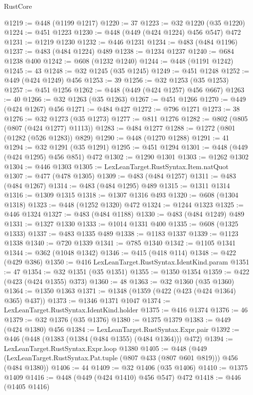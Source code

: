 \begin{lexlean}{RustCore}
\begin{coremodule}
@1219 := @448 (@1199 @1217)
@1220 := 37
@1223 := @32 @1220 (@35 @1220)
@1224 := @451 @1223
@1230 := @448 (@449 (@424 @1224) @456 @547) @472
@1231 := @1219 @1230
@1232 := @446 @1231
@1234 := @483 (@484 @1196)
@1237 := @483 (@484 @1224) @489
@1238 := @1234 @1237
@1240 := @684 @1238 @400
@1242 := @608 (@1232 @1240)
@1244 := @448 (@1191 @1242)
@1245 := 43
@1248 := @32 @1245 (@35 @1245)
@1249 := @451 @1248
@1252 := @449 (@424 @1249) @456
@1253 := 39
@1256 := @32 @1253 (@35 @1253)
@1257 := @451 @1256
@1262 := @448 (@449 (@424 @1257) @456 @667)
@1263 := 40
@1266 := @32 @1263 (@35 @1263)
@1267 := @451 @1266
@1270 := @449 (@424 @1267) @456
@1271 := @484 @427
@1272 := @796 @1271
@1273 := 38
@1276 := @32 @1273 (@35 @1273)
@1277 := @811 @1276
@1282 := @802 (@805 (@807 (@424 @1277) @1113))
@1283 := @484 @1277
@1288 := @1272 (@801 (@1282 (@526 @1283)) @829)
@1290 := @448 (@1270 @1288)
@1291 := 41
@1294 := @32 @1291 (@35 @1291)
@1295 := @451 @1294
@1301 := @448 (@449 (@424 @1295) @456 @851) @472
@1302 := @1290 @1301
@1303 := @1262 @1302
@1304 := @446 @1303
@1305 := LexLeanTarget.RustSyntax.Item.natQuot
@1307 := @477 (@478 @1305)
@1309 := @483 (@484 @1257)
@1311 := @483 (@484 @1267)
@1314 := @483 (@484 @1295) @489
@1315 := @1311 @1314
@1316 := @1309 @1315
@1318 := @1307 @1316 @493
@1320 := @608 (@1304 @1318)
@1323 := @448 (@1252 @1320) @472
@1324 := @1244 @1323
@1325 := @446 @1324
@1327 := @483 (@484 @1188)
@1330 := @483 (@484 @1249) @489
@1331 := @1327 @1330
@1333 := @1014 @1331 @400
@1335 := @608 (@1325 @1333)
@1337 := @483 @1335 @489
@1338 := @1183 @1337
@1339 := @1123 @1338
@1340 := @720 @1339
@1341 := @785 @1340
@1342 := @1105 @1341
@1344 := @362 (@1048 @1342)
@1346 := @415 (@418 @114)
@1348 := @422 (@429 @386)
@1350 := @416 LexLeanTarget.RustSyntax.IdentKind.param
@1351 := 47
@1354 := @32 @1351 (@35 @1351)
@1355 := @1350 @1354
@1359 := @422 (@423 (@424 @1355) @373)
@1360 := 48
@1363 := @32 @1360 (@35 @1360)
@1364 := @1350 @1363
@1371 := @1348 (@1359 (@422 (@423 (@424 @1364) @365) @437))
@1373 := @1346 @1371 @1047
@1374 := LexLeanTarget.RustSyntax.IdentKind.holder
@1375 := @416 @1374
@1376 := 46
@1379 := @32 @1376 (@35 @1376)
@1380 := @1375 @1379
@1383 := @449 (@424 @1380) @456
@1384 := LexLeanTarget.RustSyntax.Expr.pair
@1392 := @446 (@448 (@1383 (@1384 (@484 @1355) (@484 @1364))) @472)
@1394 := LexLeanTarget.RustSyntax.Expr.loop @1380
@1405 := @448
    (@449 (LexLeanTarget.RustSyntax.Pat.tuple (@807 @433 (@807 @601 @819))) @456 (@484 @1380))
@1406 := 44
@1409 := @32 @1406 (@35 @1406)
@1410 := @1375 @1409
@1416 := @448 (@449 (@424 @1410) @456 @547) @472
@1418 := @446 (@1405 @1416)

\end{coremodule}
\end{lexlean}
